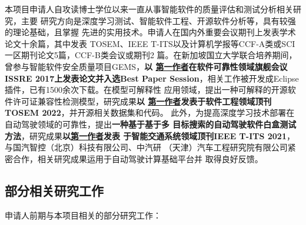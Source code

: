 \documentclass[a4paper,zihao=-4]{article}
\begin{document}
本项目申请人自攻读博士学位以来一直从事智能软件的质量评估和测试分析相关研究，主要
研究方向是深度学习测试、智能软件工程、开源软件分析等，具有较强的理论基础，且掌握
先进的实用技术。{申请人在国内外重要会议期刊上发表学术论文十余篇，其中发表
TOSEM、IEEE T-ITS以及计算机学报等CCF-A类或SCI一区期刊论文5篇，CCF-B类会议或期刊2
篇}。在新加坡国立大学联合培养期间，曾参与智能软件安全质量项目GEMS，\textbf{以
{\underline{第一作者}在软件可靠性领域旗舰会议ISSRE 2017上发表论文并入选{Best
Paper Session}}}，相关工作被开发成Eclipse插件，已有1500余次下载。在模型可解释性
应用领域，提出一种可解释的开源软件许可证兼容性检测模型，研究成果\textbf{以
\underline{第一作者}发表于软件工程领域顶刊TOSEM 2022}，并开源相关数据集和代码。
此外，{为提高深度学习技术部署在自动驾驶领域的可靠性}，提出\textbf{一种基于基于多
目标搜索的自动驾驶软件白盒测试方法}，研究成果\textbf{以\underline{第一作者}发表
于智能交通系统领域顶刊IEEE T-ITS 2021}，与国汽智控（北京）科技有限公司、中汽研
（天津）汽车工程研究院有限公司紧密合作，相关研究成果运用于自动驾驶计算基础平台并
取得良好反馈。

\subsection{部分相关研究工作}


申请人前期与本项目相关的部分研究工作：
\end{document}
